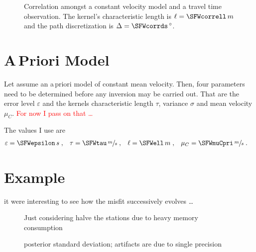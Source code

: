 \documentclass[11pt]{article}
\newcommand\worries[1]{\textcolor{red}{#1}}
\begin{document}
\begin{figure}
    
    \centering
    
    \caption{Correlation amongst a constant velocity model and a travel time observation.
        The kernel's characteristic length is $\ell=\SFWcorrell\,m$ and the path discretization is $\Delta = \SFWcorrds\,{}^\circ$. }
    \label{fig:correlation}
\end{figure}


\section{A\,Priori Model}

Let assume an a\,priori model of constant mean velocity.
Then, four parameters need to be determined before any inversion may be carried out.
That are the error level $\varepsilon$ and the kernels characteristic length $\tau$, variance $\sigma$ and mean velocity $\mu_C$.
\worries{For now I pass on that \dots }

The values I use are
\begin{align}
    \varepsilon &= \SFWepsilon \, s \;,&
    \tau &= \SFWtau \, \sfrac ms \;,&
    \ell &= \SFWell \, m \;,&
    \mu_C &= \SFWmuCpri \, \sfrac ms \;.
\end{align}


\section{Example}

it were interesting to see how the misfit successively evolves \dots
\begin{figure}
    \centering
    
    \caption{Just considering halve the stations due to heavy memory consumption }
    \label{fig:example}
\end{figure}

\begin{figure}
    \centering
    
    \caption{posterior standard deviation; artifacts are due to single precision }
    \label{fig:example_var}
\end{figure}
\end{document}
